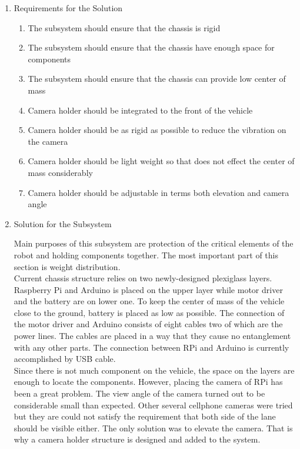 \documentclass[a4paper,12pt]{article}
\begin{document}
\begin{enumerate}

\item {Requirements for the Solution}


\begin{enumerate}

\item The subsystem should ensure that the chassis is rigid 

\item The subsystem should ensure that the chassis have enough space for components

\item The subsystem should ensure that the chassis can provide low center of mass 

\item Camera holder should be integrated to the front of the vehicle

\item Camera holder should be as rigid as possible to reduce the vibration on the camera

\item Camera holder should be light weight so that does not effect the center of mass considerably

\item Camera holder should be adjustable in terms both elevation and camera angle


\end{enumerate}


\item {Solution for the Subsystem}

Main purposes of this subsystem are protection of the critical elements of the robot and holding components together. The most important part of this section is weight distribution.\\

Current chassis structure relies on two newly-designed plexiglass layers. Raspberry Pi and Arduino is placed on the upper layer while motor driver and the battery are on lower one. To keep the center of mass of the vehicle close to the ground, battery is placed as low as possible. The connection of the motor driver and Arduino consists of eight cables two of which are the power lines. The cables are placed in a way that they cause no entanglement with any other parts. The connection between RPi and Arduino is currently accomplished by USB cable. \\


Since there is not much component on the vehicle, the space on the layers are enough to locate the components. However, placing the camera of RPi has been a great problem. The view angle of the camera turned out to be considerable small than expected. Other several cellphone cameras were tried but they are could not satisfy the requirement that both side of the lane should be visible either. The only solution was to elevate the camera. That is why a camera holder structure is designed and added to the system.\\	



\end{enumerate}
\end{document}
